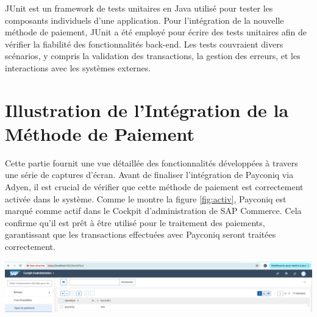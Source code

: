 JUnit est un framework de tests unitaires en Java utilisé pour tester les composants individuels d'une application. Pour l'intégration de la nouvelle méthode de paiement, JUnit a été employé pour écrire des tests unitaires afin de vérifier la fiabilité des fonctionnalités back-end. Les tests couvraient divers scénarios, y compris la validation des transactions, la gestion des erreurs, et les interactions avec les systèmes externes.
\section{Illustration de l'Intégration de la Méthode de Paiement}
Cette partie fournit une vue détaillée des fonctionnalités développées à travers une série de captures d’écran.
Avant de finaliser l'intégration de Payconiq via Adyen, il est crucial de vérifier que cette méthode de paiement est correctement activée dans le système. Comme le montre la figure \ref{fig:activ}, Payconiq est marqué comme actif dans le Cockpit d'administration de SAP Commerce. 
Cela confirme qu'il est prêt à être utilisé pour le traitement des paiements, garantissant que les transactions effectuées avec Payconiq seront traitées correctement.
\begin{center}
    \centering
    \includegraphics[width=19cm]{Figures/Screens/VERIFIER QUE payment activer.png}
    \label{fig:activ}
\end{center}

